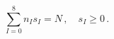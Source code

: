 \begin{equation}  \label{Kacond}
\sum_{I = 0}^{8} n_I s_I = N\,, \quad s_I \ge 0\,.
\end{equation}

